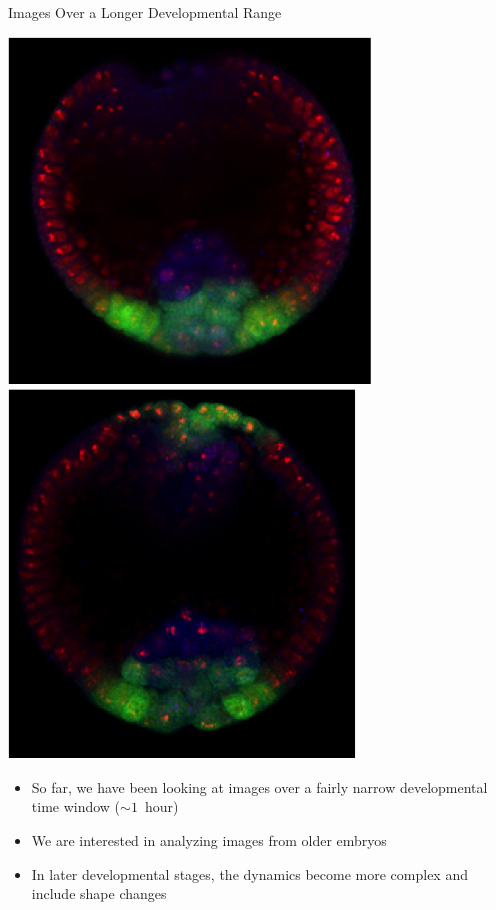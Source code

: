 \documentclass[10pt]{beamer}
\begin{document}
\begin{frame}{Images Over a Longer Developmental Range}
\begin{center}
\hspace{0.2in}
\includegraphics[width=\imwidth]{longtime10}
\hspace{0.2in}
\includegraphics[width=\imwidth]{longtime11}
\end{center}

\begin{itemize}

\item So far, we have been looking at images over a fairly narrow developmental time window ($\sim 1$~hour)
\item We are interested in analyzing images from older embryos
\item In later developmental stages, the dynamics become more complex and include shape changes

\end{itemize}

\end{frame}
\end{document}
